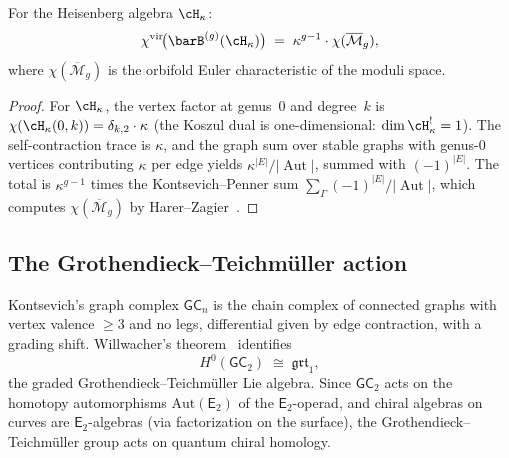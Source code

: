 \begin{corollary}\label{cor:heisenberg-euler-char}
For the Heisenberg algebra $\cH_\kappa$:
\begin{equation}\label{eq:heisenberg-euler-graph}
\chi^{\mathrm{vir}}\!\bigl(\barB^{(g)}(\cH_\kappa)\bigr)
\;=\;
\kappa^{g-1} \cdot \chi(\overline{\mathcal{M}}_g),
\end{equation}
where $\chi(\overline{\mathcal{M}}_g)$ is the orbifold Euler
characteristic of the moduli space.
\end{corollary}

\begin{proof}
For $\cH_\kappa$, the vertex factor at genus~$0$ and degree~$k$ is
$\chi(\cH_\kappa(0,k)) = \delta_{k,2} \cdot \kappa$ (the Koszul
dual is one-dimensional: $\dim \cH^!_\kappa = 1$).
The self-contraction trace is $\kappa$, and the graph sum over
stable graphs with genus-$0$ vertices contributing $\kappa$ per
edge yields $\kappa^{|E|} / |\!\operatorname{Aut}|$, summed with
$(-1)^{|E|}$. The total is $\kappa^{g-1}$ times the
Kontsevich--Penner sum $\sum_\Gamma
(-1)^{|E|}/|\!\operatorname{Aut}|$, which computes
$\chi(\overline{\mathcal{M}}_g)$ by
Harer--Zagier~\cite{HZ86,Penner88}.
\end{proof}

\subsection{The Grothendieck--Teichm\"uller action}
\label{subsec:grt-action}

\begin{remark}%
\label{rem:gc-grt}
Kontsevich's graph complex $\mathsf{GC}_n$ is the chain complex
of connected graphs with vertex valence $\geq 3$ and no legs,
differential given by edge contraction, with a grading shift.
Willwacher's theorem~\cite{Willwacher15} identifies
\begin{equation}\label{eq:willwacher}
H^0(\mathsf{GC}_2) \;\cong\; \mathfrak{grt}_1,
\end{equation}
the graded Grothendieck--Teichm\"uller Lie algebra. Since
$\mathsf{GC}_2$ acts on the homotopy automorphisms
$\mathrm{Aut}(\mathsf{E}_2)$ of the $\mathsf{E}_2$-operad, and
chiral algebras on curves are $\mathsf{E}_2$-algebras (via
factorization on the surface), the Grothendieck--Teichm\"uller
group acts on quantum chiral homology.
\end{remark}

